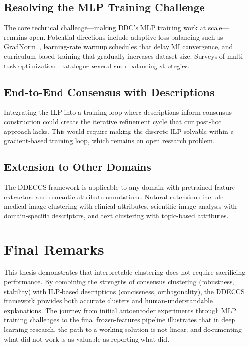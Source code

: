 \subsection{Resolving the MLP Training Challenge}

The core technical challenge---making DDC's MLP training work at scale---remains open. Potential directions include adaptive loss balancing such as GradNorm~\citep{Chen2018GradNorm}, learning-rate warmup schedules that delay MI convergence, and curriculum-based training that gradually increases dataset size. Surveys of multi-task optimization~\citep{Crawshaw2020} catalogue several such balancing strategies.

\subsection{End-to-End Consensus with Descriptions}

Integrating the ILP into a training loop where descriptions inform consensus construction could create the iterative refinement cycle that our post-hoc approach lacks. This would require making the discrete ILP solvable within a gradient-based training loop, which remains an open research problem.

\subsection{Extension to Other Domains}

The DDECCS framework is applicable to any domain with pretrained feature extractors and semantic attribute annotations. Natural extensions include medical image clustering with clinical attributes, scientific image analysis with domain-specific descriptors, and text clustering with topic-based attributes.

\section{Final Remarks}

This thesis demonstrates that interpretable clustering does not require sacrificing performance. By combining the strengths of consensus clustering (robustness, stability) with ILP-based descriptions (conciseness, orthogonality), the DDECCS framework provides both accurate clusters and human-understandable explanations. The journey from initial autoencoder experiments through MLP training challenges to the final frozen-features pipeline illustrates that in deep learning research, the path to a working solution is not linear, and documenting what did not work is as valuable as reporting what did.